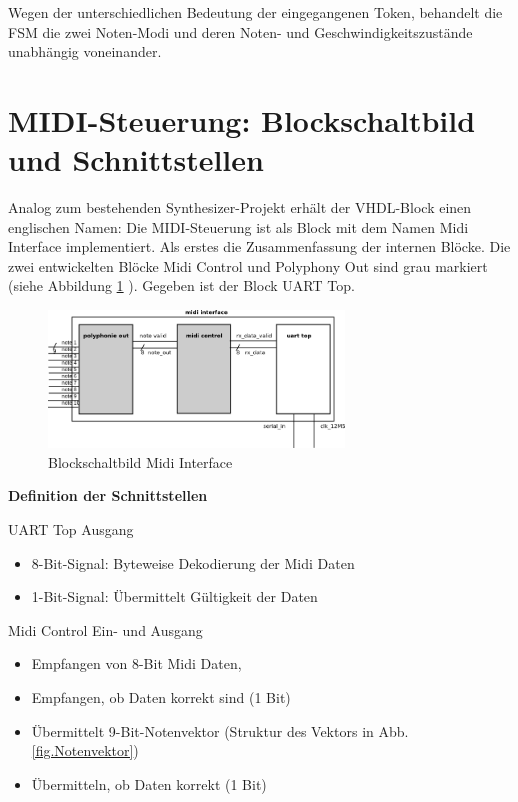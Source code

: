 Wegen der unterschiedlichen Bedeutung der eingegangenen Token, behandelt die FSM die zwei Noten-Modi und deren Noten- und Geschwindigkeitszustände unabhängig voneinander.


\section{MIDI-Steuerung: Blockschaltbild und Schnittstellen}

Analog zum bestehenden Synthesizer-Projekt erhält der VHDL-Block einen englischen Namen: Die MIDI-Steuerung ist als Block mit dem Namen Midi Interface implementiert. Als erstes die Zusammenfassung der internen Blöcke. Die zwei entwickelten Blöcke Midi Control und Polyphony Out sind grau markiert (siehe Abbildung \ref{fig.midi_interface_block} ). Gegeben ist der Block UART Top.

\begin{figure}[H]
	\includegraphics[width=0.7\textwidth]{images/midi_interface/midi_interface_block.png}
	\caption{Blockschaltbild Midi Interface}
	\label{fig.midi_interface_block}
\end{figure}

\textbf{Definition der Schnittstellen}\label{schnittstellen}

UART Top Ausgang

\begin{itemize}
	\item 8-Bit-Signal: Byteweise Dekodierung der Midi Daten 
	\item 1-Bit-Signal: Übermittelt Gültigkeit der Daten
\end{itemize}

Midi Control Ein- und Ausgang

\begin{itemize}
	\item Empfangen von 8-Bit Midi Daten,
    \item Empfangen, ob Daten korrekt sind (1 Bit)
	\item Übermittelt 9-Bit-Notenvektor (Struktur des Vektors in Abb.\ref{fig.Notenvektor})
    \item Übermitteln, ob Daten korrekt (1 Bit)
\end{itemize}

